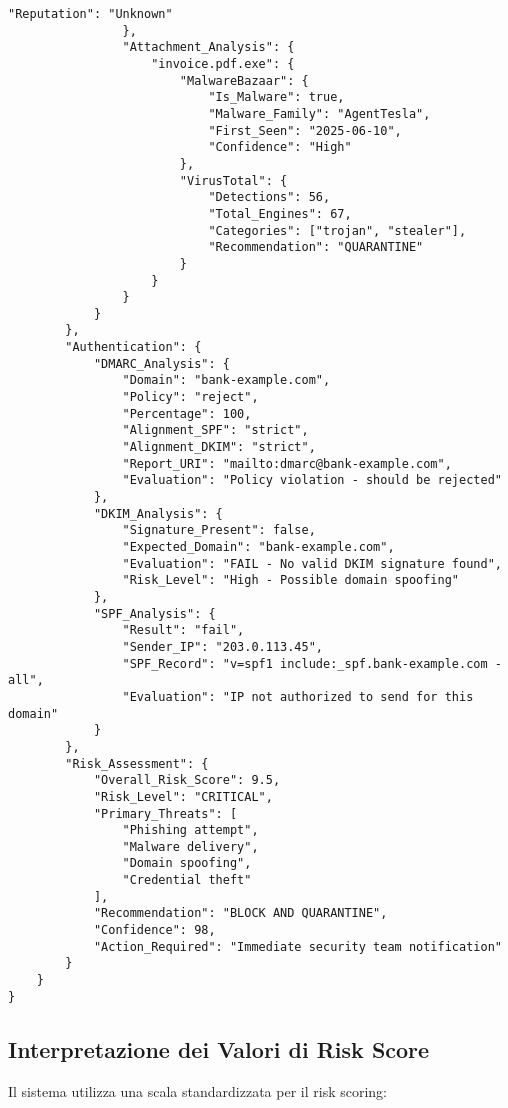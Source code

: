\documentclass{article}
\begin{document}
\begin{lstlisting}[caption=Esempio output JSON dettagliato]
                    "Reputation": "Unknown"
                },
                "Attachment_Analysis": {
                    "invoice.pdf.exe": {
                        "MalwareBazaar": {
                            "Is_Malware": true,
                            "Malware_Family": "AgentTesla",
                            "First_Seen": "2025-06-10",
                            "Confidence": "High"
                        },
                        "VirusTotal": {
                            "Detections": 56,
                            "Total_Engines": 67,
                            "Categories": ["trojan", "stealer"],
                            "Recommendation": "QUARANTINE"
                        }
                    }
                }
            }
        },
        "Authentication": {
            "DMARC_Analysis": {
                "Domain": "bank-example.com",
                "Policy": "reject",
                "Percentage": 100,
                "Alignment_SPF": "strict",
                "Alignment_DKIM": "strict",
                "Report_URI": "mailto:dmarc@bank-example.com",
                "Evaluation": "Policy violation - should be rejected"
            },
            "DKIM_Analysis": {
                "Signature_Present": false,
                "Expected_Domain": "bank-example.com",
                "Evaluation": "FAIL - No valid DKIM signature found",
                "Risk_Level": "High - Possible domain spoofing"
            },
            "SPF_Analysis": {
                "Result": "fail",
                "Sender_IP": "203.0.113.45",
                "SPF_Record": "v=spf1 include:_spf.bank-example.com -all",
                "Evaluation": "IP not authorized to send for this domain"
            }
        },
        "Risk_Assessment": {
            "Overall_Risk_Score": 9.5,
            "Risk_Level": "CRITICAL",
            "Primary_Threats": [
                "Phishing attempt",
                "Malware delivery", 
                "Domain spoofing",
                "Credential theft"
            ],
            "Recommendation": "BLOCK AND QUARANTINE",
            "Confidence": 98,
            "Action_Required": "Immediate security team notification"
        }
    }
}
\end{lstlisting}


\subsection{Interpretazione dei Valori di Risk Score}

Il sistema utilizza una scala standardizzata per il risk scoring:
\end{document}
